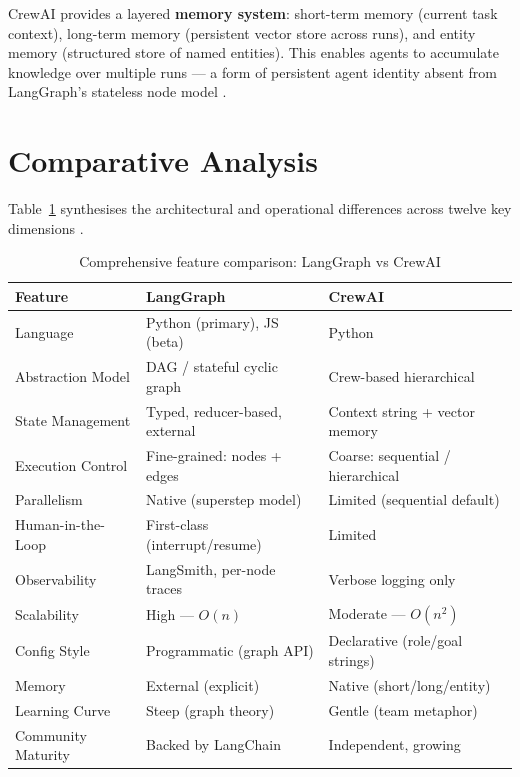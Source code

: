 \documentclass[12pt,a4paper]{article}
\begin{document}
CrewAI provides a layered \textbf{memory system}: short-term memory (current
task context), long-term memory (persistent vector store across runs), and
entity memory (structured store of named entities). This enables agents to
accumulate knowledge over multiple runs --- a form of persistent agent identity
absent from LangGraph's stateless node model \cite{CrewAI2023Docs}.

\section{Comparative Analysis}

Table~\ref{tab:comparison} synthesises the architectural and operational
differences across twelve key dimensions \cite{Rogers2023Survey}.

\begin{table}[H]
    \centering
    \caption{Comprehensive feature comparison: LangGraph vs CrewAI}
    \label{tab:comparison}
    \renewcommand{\arraystretch}{1.4}
    \begin{tabularx}{\textwidth}{l X X}
        \toprule
        \textbf{Feature} & \textbf{LangGraph} & \textbf{CrewAI} \\
        \midrule
        Language           & Python (primary), JS (beta) & Python \\
        Abstraction Model  & DAG / stateful cyclic graph & Crew-based hierarchical \\
        State Management   & Typed, reducer-based, external & Context string + vector memory \\
        Execution Control  & Fine-grained: nodes + edges  & Coarse: sequential / hierarchical \\
        Parallelism        & Native (superstep model)     & Limited (sequential default) \\
        Human-in-the-Loop  & First-class (interrupt/resume) & Limited \\
        Observability      & LangSmith, per-node traces   & Verbose logging only \\
        Scalability        & High --- $O(n)$              & Moderate --- $O(n^2)$ \\
        Config Style       & Programmatic (graph API)     & Declarative (role/goal strings) \\
        Memory             & External (explicit)          & Native (short/long/entity) \\
        Learning Curve     & Steep (graph theory)         & Gentle (team metaphor) \\
        Community Maturity & Backed by LangChain          & Independent, growing \\
        \bottomrule
    \end{tabularx}
\end{table}
\end{document}
